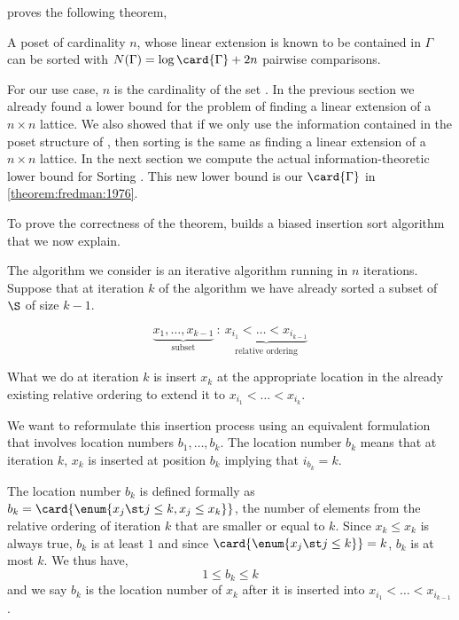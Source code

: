 \citet{fredman:1976} proves the following theorem,
\begin{theorem}\label{theorem:fredman:1976}
A poset of cardinality $n$, whose linear extension is known to be contained in
$\Gamma$ can be sorted with $N(\Gamma) = \log \card{\Gamma} + 2n$ pairwise
comparisons.
\end{theorem}
For our use case, \(n\) is the cardinality of the set
\XY. In the previous section we already found a lower bound for the problem of
finding a linear extension of a \(n \times n\) lattice. We also showed that if
we only use the information contained in the poset structure of \XY, then
sorting \XY is the same as finding a linear extension of a \(n \times
n\) lattice. In the next section we compute the actual information-theoretic lower bound for
Sorting \XY. This
new lower bound is our $\card{\Gamma}$ in \ref{theorem:fredman:1976}.

To prove the correctness of the theorem, \citet{fredman:1976} builds a biased
insertion sort algorithm that we now explain.

The algorithm we consider is an iterative algorithm running in \(n\)
iterations. Suppose that at iteration \(k\) of the algorithm we have already sorted a
subset of \(\S\) of size \(k-1\).

\begin{displaymath}
\underbrace{x_1, \ldots, x_{k-1}}_{\text{subset}}~:~\underbrace{x_{i_1} <
\ldots < x_{i_{k-1}}}_{\text{relative ordering}}
\end{displaymath}

What we do at iteration $k$ is insert $x_k$ at the appropriate location
in the already existing relative ordering to extend it to $x_{i_1} < \ldots <
x_{i_k}$.

We want to reformulate this insertion process using an equivalent formulation
that involves location numbers $b_1, \ldots, b_k$. The location
number $b_k$ means that at iteration $k$, $x_k$ is inserted at position
$b_k$ implying that $i_{b_k} = k$.

The location number $b_k$ is defined formally as $b_k = \card{\enum{x_j \st j
\le k, x_j \le x_k}}$, \ie the number of elements from the relative ordering
of iteration $k$ that are smaller or equal to $k$. Since $x_k \le x_k$ is
always true, $b_k$ is at least $1$ and since $\card{\enum{x_j \st j \le k}} =
k$, $b_k$ is at most $k$. We thus have,
$$ 1 \le b_k \le k$$
and we say $b_k$ is the location number of $x_k$ after it is inserted into
$x_{i_1} < \ldots < x_{i_{k-1}}$.

